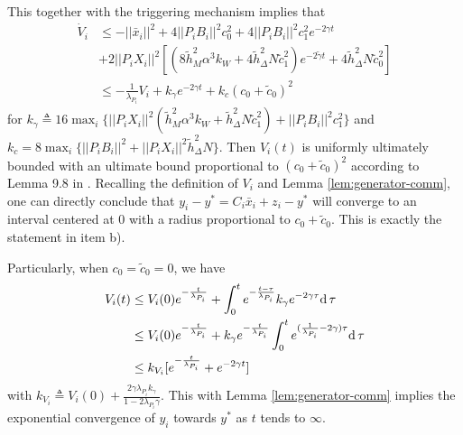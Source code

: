 \documentclass[sort&compress]{IEEEtran}
\begin{document}
This together with  the triggering mechanism implies that  
\begin{align}\label{eq1:thm-main-control}
	\dot{V}_i & \leq - ||\bar x_i||^2+ 4||P_iB_i||^2 c_0^2+4||P_iB_i||^2 c_1^2 e^{-2 \gamma t}\nonumber\\
	&+ 2 ||P_iX_i||^2 [(8\tilde h_M^2 \alpha^3 k_{W}+4\tilde h_\Delta^2 N\tilde c_1^2)  e^{-2\tilde \gamma t} + 4\tilde h_\Delta^2 N  \tilde c_0^2] \nonumber\\
	&\leq - \frac{1}{\lambda_{P_i}}V_i+k_\gamma e^{- 2\gamma t} + k_c (c_0+\tilde c_0)^2%
\end{align}
for $k_\gamma \triangleq 16 \max_{i}\{ ||P_iX_i||^2 ( \tilde h_M^2 \alpha^3 k_{W}+ \tilde h_\Delta^2 N\tilde c_1^2)+ ||P_iB_i||^2 c_1^2 \}$ and $k_c=8\max_i\{  ||P_iB_i||^2+  ||P_iX_i||^2 \tilde h_\Delta^2 N \}$. Then $V_i(t)$ is uniformly ultimately bounded with an ultimate bound proportional to $(c_0+\tilde c_0)^2$ according to Lemma 9.8 in \cite{khalil2002nonlinear}. Recalling the definition of $V_i$ and Lemma \ref{lem:generator-comm}, one can directly conclude that $y_i-y^*=C_i\bar x_i+z_i-y^*$ will converge to an interval centered at $0$ with a radius proportional to $c_0+\tilde c_0$. This is exactly the statement in item b). 

Particularly, when $c_0= \tilde c_0=0$, we have 
\begin{align}\label{eq2:thm-main-control}
	V_i(t)&\leq V_i(0)e^{-\frac{t}{\lambda_{P_i}}}+ \int_{0}^t e^{-\frac{t-\tau}{\lambda_{P_i}}} k_\gamma e^{-2\gamma \tau } {\rm d}\,\tau \nonumber\\
	&\leq V_i(0)e^{-\frac{t}{\lambda_{P_i}}}+ k_\gamma  e^{-\frac{t}{\lambda_{P_i}}} \int_{0}^t e^{(\frac{1}{\lambda_{P_i}}-2\gamma)\tau } {\rm d}\,\tau \nonumber\\
	&\leq k_{V_i} [e^{-\frac{t}{\lambda_{P_i}}}+e^{-2\gamma t}]
\end{align}
with $k_{V_i} \triangleq V_i(0)+\frac{2\gamma\lambda_{P_i} k_\gamma }{1-2\lambda_{P_i} \gamma}$. This with Lemma \ref{lem:generator-comm} implies  the exponential convergence of $y_i$ towards $y^*$ as $t$ tends to $\infty$. 
\end{document}
